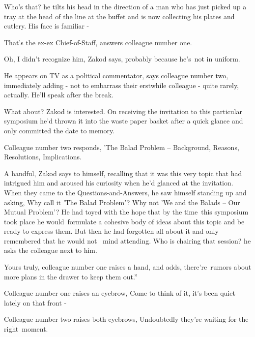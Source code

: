 \documentclass[letterpaper]{article}
\begin{document}
{\textquotedbl}Who's that?{\textquotedbl} he tilts his head in the direction of a man who has just picked up a tray at
the head of the line at the buffet and is now collecting his plates and cutlery. {\textquotedbl}His face is familiar
-{\textquotedbl} 

{\textquotedbl}That's the ex-ex Chief-of-Staff,{\textquotedbl} answers colleague number one. 

{\textquotedbl}Oh, I didn't recognize him,{\textquotedbl} Zakod says, {\textquotedbl}probably because he's~not in
uniform.{\textquotedbl} ~

{\textquotedbl}He appears on TV as a political commentator,{\textquotedbl} says colleague number two, immediately adding
- not to embarrass their erstwhile colleague - {\textquotedbl}quite rarely, actually. He'll speak after the
break.{\textquotedbl} 

{\textquotedbl}What about?{\textquotedbl} Zakod is interested. On receiving the invitation to this particular symposium
he'd thrown it into the waste paper basket after a quick glance and only committed the date to memory. 

Colleague number two responds, {\textquotedbl}'The Balad Problem -- Background, Reasons, Resolutions,
Implications.{\textquotedbl} 

A handful, Zakod says to himself, recalling that it was this very topic that had intrigued him and aroused his curiosity
when he'd glanced at the invitation. When they{ }came{ }to the
Questions-and-Answers{, }he saw himself standing up and asking, {\textquotedbl}Why call it 'The Balad
Problem'? Why not 'We and the Balads -- Our Mutual Problem'?{\textquotedbl} He had toyed with the hope that by the
time~this symposium{ }took place he would~formulate a cohesive body of ideas about this topic and be
ready to express them. But then he had forgotten all about it and only remembered that he would not \ mind attending.
{\textquotedbl}Who is chairing that session?{\textquotedbl} he asks the colleague next to him. 

{\textquotedbl}Yours truly,{\textquotedbl} colleague number one raises a hand, and adds, {\textquotedbl}there're~rumors
about more plans in the drawer to keep them out.''

Colleague number one raises an eyebrow, {\textquotedbl}Come to think of it, it's been quiet lately on that front
-{\textquotedbl} 

Colleague number two raises both eyebrows, {\textquotedbl}Undoubtedly they're waiting for the
right~moment.{\textquotedbl} 
\end{document}
